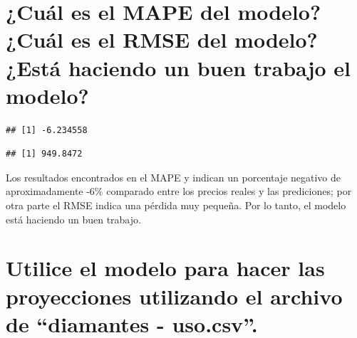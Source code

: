 \documentclass[
]{article}
\newenvironment{Shaded}{\begin{snugshade}}{\end{snugshade}}
\newcommand{\DecValTok}[1]{\textcolor[rgb]{0.00,0.00,0.81}{#1}}
\newcommand{\KeywordTok}[1]{\textcolor[rgb]{0.13,0.29,0.53}{\textbf{#1}}}
\newcommand{\NormalTok}[1]{#1}
\newcommand{\OperatorTok}[1]{\textcolor[rgb]{0.81,0.36,0.00}{\textbf{#1}}}
\newcommand{\StringTok}[1]{\textcolor[rgb]{0.31,0.60,0.02}{#1}}
\begin{document}
\hypertarget{cuuxe1l-es-el-mape-del-modelo-cuuxe1l-es-el-rmse-del-modelo-estuxe1-haciendo-un-buen-trabajo-el-modelo}{%
\section{¿Cuál es el MAPE del modelo? ¿Cuál es el RMSE del modelo? ¿Está
haciendo un buen trabajo el
modelo?}\label{cuuxe1l-es-el-mape-del-modelo-cuuxe1l-es-el-rmse-del-modelo-estuxe1-haciendo-un-buen-trabajo-el-modelo}}

\begin{Shaded}
\end{Shaded}

\begin{verbatim}
## [1] -6.234558
\end{verbatim}

\begin{Shaded}
\end{Shaded}

\begin{verbatim}
## [1] 949.8472
\end{verbatim}

Los resultados encontrados en el MAPE y indican un porcentaje negativo
de aproximadamente -6\% comparado entre los precios reales y las
prediciones; por otra parte el RMSE indica una pérdida muy pequeña. Por
lo tanto, el modelo está haciendo un buen trabajo.

\hypertarget{utilice-el-modelo-para-hacer-las-proyecciones-utilizando-el-archivo-de-diamantes---uso.csv.}{%
\section{Utilice el modelo para hacer las proyecciones utilizando el
archivo de ``diamantes -
uso.csv''.}\label{utilice-el-modelo-para-hacer-las-proyecciones-utilizando-el-archivo-de-diamantes---uso.csv.}}
\end{document}
